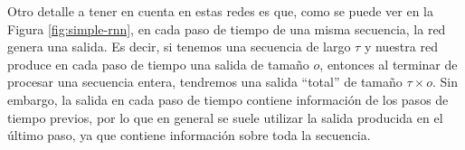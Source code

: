 \documentclass[../../main.tex]{subfiles}
\begin{document}
Otro detalle a tener en cuenta en estas redes es que, como se puede ver en la Figura
\ref{fig:simple-rnn}, en cada paso de tiempo de una misma secuencia, la red genera una
salida. Es decir, si tenemos una secuencia de largo \(\tau\) y nuestra red produce en cada
paso de tiempo una salida de tamaño \(o\), entonces al terminar de procesar una secuencia
entera, tendremos una salida ``total'' de tamaño \(\tau \times o\). Sin embargo,
la salida en cada paso de tiempo contiene información de los pasos de tiempo previos,
por lo que en general se suele utilizar la salida producida en el último paso, ya
que contiene información sobre toda la secuencia.

\end{document}
